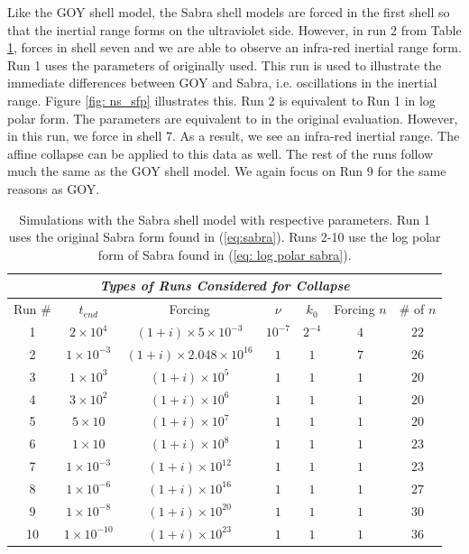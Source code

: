 Like the GOY shell model, the Sabra shell models are forced in the first shell so that the inertial range forms on the ultraviolet side.  However, in run 2 from Table \ref{table: app Sabra table}, forces in shell seven and we are able to observe an infra-red inertial range form. Run 1 uses the parameters of \cite{Yamada} originally used.  This run is used to illustrate the immediate differences between GOY and Sabra, i.e. oscillations in the inertial range.  Figure \ref{fig: ns_sfp} illustrates this.  Run 2 is equivalent to Run 1 in log polar form. The parameters are equivalent to \cite{Yamada} in the original evaluation.  However, in this run, we force in shell 7.  As a result, we see an infra-red inertial range. The affine collapse can be applied to this data as well.  The rest of the runs follow much the same as the GOY shell model.  We again focus on Run 9 for the same reasons as GOY.

\begin{table}[!htp]
        \begin{center}
        \caption{Simulations with the Sabra shell model with respective parameters. Run 1 uses the original Sabra form found in (\ref{eq:sabra}).  Runs 2-10 use the log polar form of Sabra found in (\ref{eq: log polar sabra}).}
        \begin{tabular}{||c|c|c|c|c|c|c||} \hline	
        \multicolumn{7}{|c|}{\emph{Types of Runs Considered for Collapse}} \\ \hline \hline
        Run $\#$    &$t_{end}$         &Forcing 			&$\nu$ 	   &$k_{0}$ &Forcing $n$ &$\#$ of $n$\\ \hline \hline
        1 &$2\times10^4$   &$(1+i)\times5\times10^{-3}$   &$10^{-7}$&$2^{-4}$ &$4$ &$22$\\
        2 &$1\times10^{-3}$ &$(1+i)\times2.048\times10^{16}$&$1$ 	   &$1$      &$7$ &$26$\\
        3 &$1\times10^{3}$ &$(1+i)\times10^{5}$		      &$1$	   &$1$	     &$1$ &$20$\\
        4 &$3\times10^{2}$ &$(1+i)\times10^{6}$	          &$1$	   &$1$	     &$1$ &$20$\\
        5 &$5\times10$ &$(1+i)\times10^{7}$		      &$1$	   &$1$	     &$1$ &$20$\\
        6 &$1\times10$ &$(1+i)\times10^{8}$  	      &$1$ 	   &$1$      &$1$ &$23$\\
        7 &$1\times10^{-3}$ &$(1+i)\times10^{12}$  	      &$1$ 	   &$1$      &$1$ &$23$\\
        8 &$1\times10^{-6}$ &$(1+i)\times10^{16}$  	      &$1$ 	   &$1$      &$1$ &$27$\\
        9 &$1\times10^{-8}$ &$(1+i)\times10^{20}$  	      &$1$     &$1$      &$1$ &$30$\\
        10&$1\times10^{-10}$ &$(1+i)\times10^{23}$	          &$1$	   &$1$      &$1$ &$36$\\
         \hline \hline
        \end{tabular}
        \end{center}
        \label{table: app Sabra table}
\end{table}
